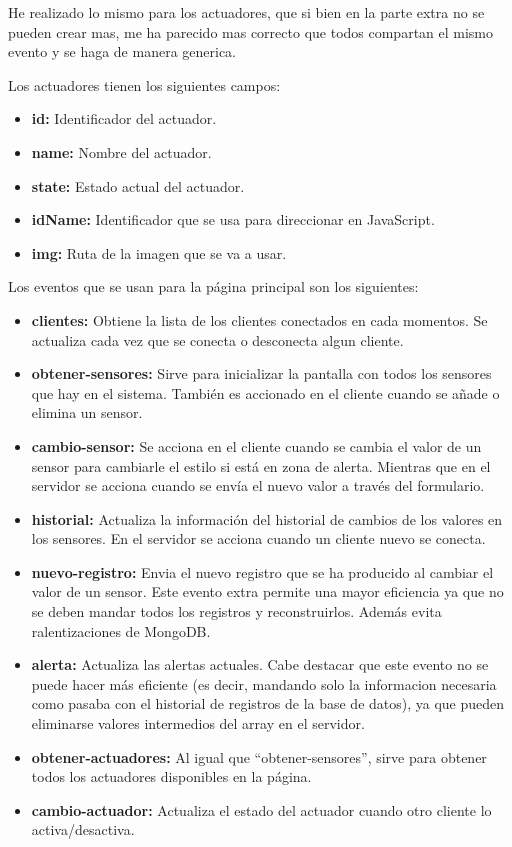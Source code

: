 \documentclass{article}
\begin{document}

He realizado lo mismo para los actuadores, que si bien en la parte extra no se pueden crear mas, me ha parecido mas correcto que todos compartan el mismo evento y se haga de manera generica.

Los actuadores tienen los siguientes campos:

\begin{itemize}
    \item \textbf{id: }Identificador del actuador.
    \item \textbf{name: }Nombre del actuador.
    \item \textbf{state: }Estado actual del actuador.
    \item \textbf{idName: }Identificador que se usa para direccionar en JavaScript.
    \item \textbf{img: }Ruta de la imagen que se va a usar.
\end{itemize}

Los eventos que se usan para la página principal son los siguientes:

\begin{itemize}
    \item \textbf{clientes: }Obtiene la lista de los clientes conectados en cada momentos. Se actualiza cada vez que se conecta o desconecta algun cliente.
    \item \textbf{obtener-sensores: }Sirve para inicializar la pantalla con todos los sensores que hay en el sistema. También es accionado en el cliente cuando se añade o elimina un sensor.
    \item \textbf{cambio-sensor: }Se acciona en el cliente cuando se cambia el valor de un sensor para cambiarle el estilo si está en zona de alerta. Mientras que en el servidor se acciona cuando se envía el nuevo valor a través del formulario.
    \item \textbf{historial: }Actualiza la información del historial de cambios de los valores en los sensores. En el servidor se acciona cuando un cliente nuevo se conecta.
    \item \textbf{nuevo-registro: }Envia el nuevo registro que se ha producido al cambiar el valor de un sensor. Este evento extra permite una mayor eficiencia ya que no se deben mandar todos los registros y reconstruirlos. Además evita ralentizaciones de MongoDB.
    \item \textbf{alerta: }Actualiza las alertas actuales. Cabe destacar que este evento no se puede hacer más eficiente (es decir, mandando solo la informacion necesaria como pasaba con el historial de registros de la base de datos), ya que pueden eliminarse valores intermedios del array en el servidor.
    \item \textbf{obtener-actuadores: }Al igual que ``obtener-sensores'', sirve para obtener todos los actuadores disponibles en la página.
    \item \textbf{cambio-actuador: }Actualiza el estado del actuador cuando otro cliente lo activa/desactiva.
\end{itemize}
\end{document}
